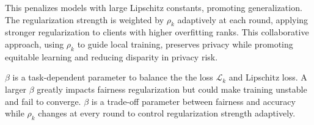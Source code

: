 This penalizes models with large Lipschitz constants, promoting generalization. The regularization strength is weighted by $\rho_k$ adaptively at each round, applying stronger regularization to clients with higher overfitting ranks. This collaborative approach, using $\rho_k$ to guide local training, preserves privacy while promoting equitable learning and reducing disparity in privacy risk. 

$\beta$ is a task-dependent parameter to balance the the loss $\mathcal{L}_k$ and Lipschitz loss. A larger $\beta$ greatly impacts fairness regularization but could make training unstable and fail to converge. $\beta$ is a trade-off parameter between fairness and accuracy while $\rho_k$ changes at every round to control regularization strength adaptively.










